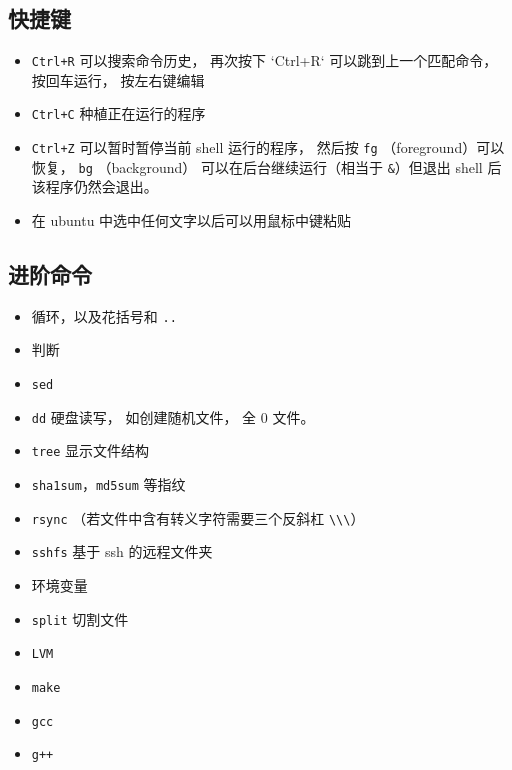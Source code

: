 \subsection{快捷键}
\begin{itemize}
\item \verb`Ctrl+R` 可以搜索命令历史， 再次按下 `Ctrl+R` 可以跳到上一个匹配命令， 按回车运行， 按左右键编辑
\item \verb`Ctrl+C` 种植正在运行的程序
\item \verb`Ctrl+Z` 可以暂时暂停当前 shell 运行的程序， 然后按 \verb`fg` （foreground）可以恢复， \verb`bg` （background） 可以在后台继续运行（相当于 \verb`&`）但退出 shell 后该程序仍然会退出。
\item 在 ubuntu 中选中任何文字以后可以用鼠标中键粘贴
\end{itemize}

\subsection{进阶命令}
\begin{itemize}
\item 循环，以及花括号和 \verb`..`
\item 判断
\item \verb`sed`
\item \verb`dd` 硬盘读写， 如创建随机文件， 全 0 文件。
\item \verb`tree` 显示文件结构
\item \verb`sha1sum`，\verb`md5sum` 等指纹
\item \verb`rsync` （若文件中含有转义字符需要三个反斜杠 \verb`\\\`）
\item \verb`sshfs` 基于 ssh 的远程文件夹
\item 环境变量
\item \verb`split` 切割文件
\item \verb`LVM`
\item \verb`make`
\item \verb`gcc`
\item \verb`g++`
\end{itemize}
